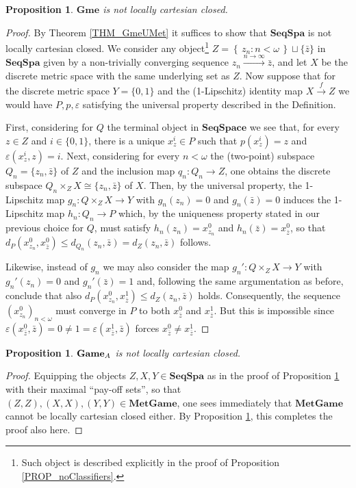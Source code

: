 \documentclass[12pt]{amsart}
\newtheorem{prop}[thm]{Proposition}
\theoremstyle{definition}
\newcommand{\set}[1]{\left\{\, {#1} \,\right\}}
\newcommand{\A}{\textup{\textmd{\textsc{A}}}}
\newcommand{\MetGame}{\mathbf{MetGame}}
\newcommand{\Games}{\mathbf{Game}}
\newcommand{\Gmes}{\mathbf{Gme}}
\begin{document}
\begin{prop}\label{PROP_GMEnotLCC}
	$\Gmes$ is not locally cartesian closed.
\end{prop}
\begin{proof}
	By  Theorem \ref{THM_GmeUMet} it suffices to show that $\mathbf{SeqSpa}$ is not locally cartesian closed. 
	We consider any object\footnote{Such object is described explicitly in the proof of Proposition \ref{PROP_noClassifiers}.} 
	$Z=\set{z_n:n<\omega}\sqcup\{\bar{z}\}$ in $\mathbf{SeqSpa}$ given by a non-trivially converging sequence $z_n\stackrel{n\to\infty}{\longrightarrow}\bar{z}$, and let $X$ be the discrete metric space with the same underlying set as $Z$. 
	Now suppose that for the discrete metric space $Y=\{0,1\}$ and the (1-Lipschitz) identity map 
	$X\stackrel{f}{\to}Z$ we would have $P, p, \varepsilon$ satisfying the universal property described in the Definition.
	
	First, considering for $Q$ the terminal object in $\mathbf{SeqSpace}$ 
	we see that, for every $z\in Z$ and $i\in \{0,1\}$, there is a unique $x_z^i\in P$ such that $p(x_z^i)=z$ and $\varepsilon(x_z^i,z)=i$. 
	Next, considering for every $n<\omega$ the (two-point) subspace $Q_n=\{z_n,\bar{z}\}$ of $Z$ and the inclusion map $q_n\colon Q_n\to Z$, one obtains the discrete subspace $Q_n\times_Z X \cong \{z_n,\bar{z}\}$ of $X$. 
	Then, by the universal property, the 1-Lipschitz map $g_n\colon Q\times_Z X\to Y$ with $g_n(z_n)=0$ and $g_n(\bar{z})=0$ induces the 1-Lipschitz map $h_n\colon Q_n\to P$ which, by the uniqueness property stated in our previous choice for $Q$, must satisfy 
	$h_n(z_n)=x_{z_n}^0$ and $h_n(\bar{z})=x_{\bar{z}}^0$, so that 
	$d_P(x_{z_n}^0, x_{\bar{z}}^ 0)\le d_{Q_n}(z_n,\bar{z})=d_Z(z_n,\bar{z})$ follows.
	
	Likewise, instead of $g_n$ we may also consider the map $g_n'\colon Q\times_Z X\to Y$ with  $g_n'(z_n)=0$ and $g_n'(\bar{z})=1$ and, following the same argumentation as before, conclude that also $d_P(x_{z_n}^0, x_{\bar{z}}^1) \le d_Z(z_n,\bar{z})$ holds. Consequently, the sequence
	$(x_{z_n}^0)_{n<\omega}$ must converge in $P$ to both $x_{\bar{z}}^0$ and $x_{\bar{z}}^1$. But this is impossible since $\varepsilon(x^0_{\bar{z}},\bar{z})=0\neq 1=\varepsilon(x^1_{\bar{z}},\bar{z})$ forces $x_{\bar{z}}^0\neq x_{\bar{z}}^1$.
\end{proof}

\begin{prop}
	$\Games_{\A}$ is not locally cartesian closed.
\end{prop}
\begin{proof}
	Equipping the objects $Z,X,Y\in\mathbf{SeqSpa}$ as in the proof of Proposition \ref{PROP_GMEnotLCC} with their maximal ``pay-off sets'', so that $(Z,Z), (X,X),(Y,Y)\in\MetGame$, one sees immediately that $\MetGame$ cannot be locally cartesian closed either. By 
	Proposition \ref{PROP_GMEnotLCC}, this completes the proof also here. 
\end{proof}
\end{document}
